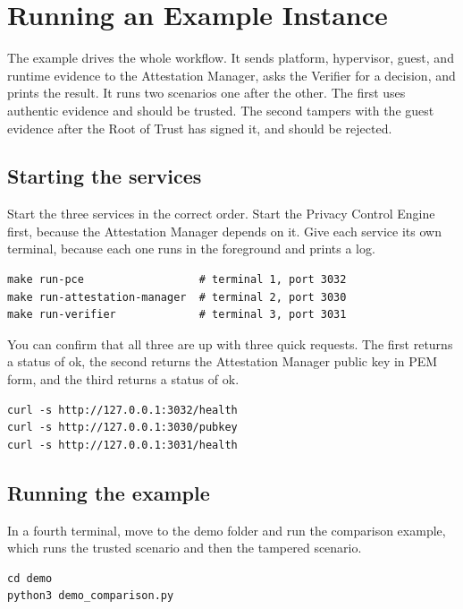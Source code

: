 \documentclass[11pt,a4paper]{article}
\begin{document}
\section{Running an Example Instance}

The example drives the whole workflow. It sends platform, hypervisor, guest, and
runtime evidence to the Attestation Manager, asks the Verifier for a decision,
and prints the result. It runs two scenarios one after the other. The first uses
authentic evidence and should be trusted. The second tampers with the guest
evidence after the Root of Trust has signed it, and should be rejected.

\subsection{Starting the services}

Start the three services in the correct order. Start the Privacy Control Engine
first, because the Attestation Manager depends on it. Give each service its own
terminal, because each one runs in the foreground and prints a log.

\begin{lstlisting}
make run-pce                  # terminal 1, port 3032
make run-attestation-manager  # terminal 2, port 3030
make run-verifier             # terminal 3, port 3031
\end{lstlisting}

You can confirm that all three are up with three quick requests. The first
returns a status of ok, the second returns the Attestation Manager public key in
PEM form, and the third returns a status of ok.

\begin{lstlisting}
curl -s http://127.0.0.1:3032/health
curl -s http://127.0.0.1:3030/pubkey
curl -s http://127.0.0.1:3031/health
\end{lstlisting}

\subsection{Running the example}

In a fourth terminal, move to the demo folder and run the comparison example,
which runs the trusted scenario and then the tampered scenario.

\begin{lstlisting}
cd demo
python3 demo_comparison.py
\end{lstlisting}
\end{document}
